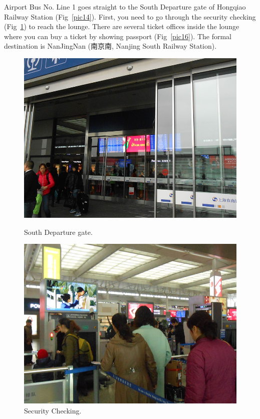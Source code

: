 \documentclass[11pt]{article}
\begin{document}
Airport Bus No. Line 1 goes straight to the South Departure gate of Hongqiao Railway Station (Fig~\ref{pic14}). First, you need to go through the security checking (Fig~\ref{pic15}) to reach the lounge. There are several ticket offices inside the lounge where you can buy a ticket by showing passport (Fig~\ref{pic16}). The formal destination is NanJingNan (南京南, Nanjing South Railway Station).
\begin{figure}[!h]
	\begin{minipage}[t]{.5\textwidth}
     	\centering
        	\includegraphics{image034.jpg}
		\caption{South Departure gate. \label{pic14}}
	\end{minipage}%
     \begin{minipage}[t]{.5\textwidth}
         \centering
         \includegraphics{image036.jpg}  
		\caption{Security Checking. \label{pic15}}
    \end{minipage}%
 \end{figure}
		
\end{document}
